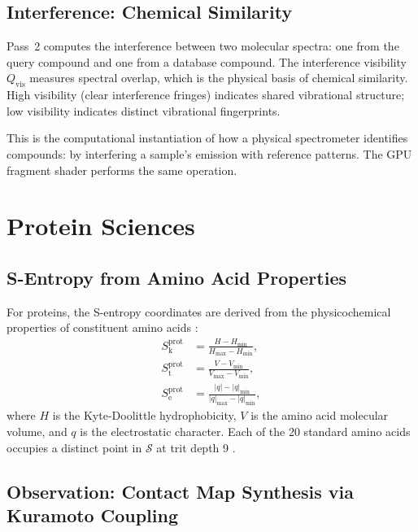 \documentclass[11pt,twocolumn,a4paper]{article}
\theoremstyle{definition}
\theoremstyle{remark}
\newcommand{\Sk}{S_{\mathrm{k}}}
\newcommand{\St}{S_{\mathrm{t}}}
\newcommand{\Se}{S_{\mathrm{e}}}
\newcommand{\Sspace}{\mathcal{S}}
\newcommand{\Qvis}{Q_{\mathrm{vis}}}
\begin{document}
\subsection{Interference: Chemical Similarity}

Pass~2 computes the interference between two molecular spectra: one from the query compound and one from a database compound. The interference visibility $\Qvis$ measures spectral overlap, which is the physical basis of chemical similarity. High visibility (clear interference fringes) indicates shared vibrational structure; low visibility indicates distinct vibrational fingerprints.

This is the computational instantiation of how a physical spectrometer identifies compounds: by interfering a sample's emission with reference patterns. The GPU fragment shader performs the same operation.


\section{Protein Sciences}
\label{sec:protein}

\subsection{S-Entropy from Amino Acid Properties}

For proteins, the S-entropy coordinates are derived from the physicochemical properties of constituent amino acids \citep{sachikonye2025c}:
\begin{align}
\Sk^{\mathrm{prot}} &= \frac{H - H_{\min}}{H_{\max} - H_{\min}}, \label{eq:sk_prot} \\
\St^{\mathrm{prot}} &= \frac{V - V_{\min}}{V_{\max} - V_{\min}}, \label{eq:st_prot} \\
\Se^{\mathrm{prot}} &= \frac{|q| - |q|_{\min}}{|q|_{\max} - |q|_{\min}}, \label{eq:se_prot}
\end{align}
where $H$ is the Kyte-Doolittle hydrophobicity, $V$ is the amino acid molecular volume, and $q$ is the electrostatic character. Each of the 20 standard amino acids occupies a distinct point in $\Sspace$ at trit depth 9 \citep{sachikonye2025c}.

\subsection{Observation: Contact Map Synthesis via Kuramoto Coupling}
\end{document}
